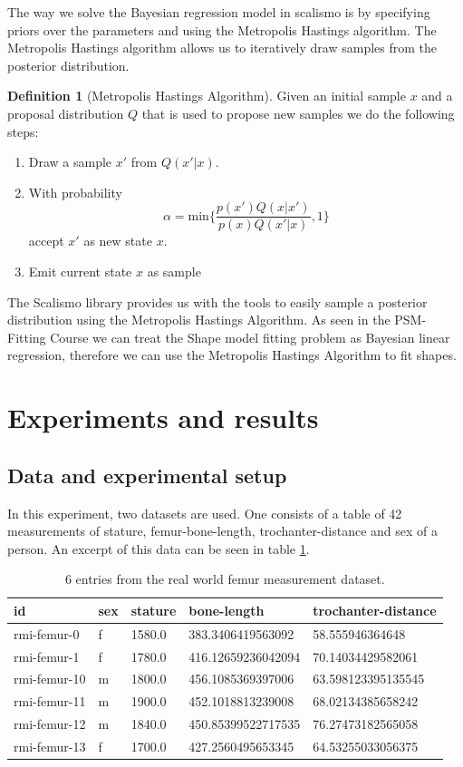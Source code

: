 \documentclass[10pt]{article}
\theoremstyle{definition}
\newtheorem{definition}{Definition}[section]
\begin{document}
\noindent
The way we solve the Bayesian regression model in scalismo is by specifying priors over the parameters and using the Metropolis Hastings algorithm. The Metropolis Hastings algorithm allows us to iteratively draw samples from the posterior distribution.

\begin{definition}[Metropolis Hastings Algorithm]\label{def:metro}
Given an initial sample $x$ and a proposal distribution $Q$ that is used to propose new samples we do the following steps:
\begin{enumerate}
\item Draw a sample $x'$ from $Q(x'|x)$.
\item With probability $$\alpha=\text{min}\{\frac{p(x')Q(x|x')}{p(x)Q(x'|x)},1\}$$
accept $x'$ as new state $x$.
\item Emit current state $x$ as sample
\end{enumerate}
\end{definition}

\noindent
The Scalismo library provides us with the tools to easily sample a posterior distribution using the Metropolis Hastings Algorithm. As seen in the PSM-Fitting Course we can treat the Shape model fitting problem as Bayesian linear regression, therefore we can use the Metropolis Hastings Algorithm to fit shapes.



\section{Experiments and results}

\subsection{Data and experimental setup}
In this experiment, two datasets are used. One consists of a table of 42 measurements of stature, femur-bone-length, trochanter-distance and sex of a person. An excerpt of this data can be seen in table \ref{table:1}.

\begin{table}[h]
    \centering
    \begin{tabular}{l|l|l|l|l}
        id & sex & stature & bone-length & trochanter-distance \\ \hline
        rmi-femur-0 & f & 1580.0 & 383.3406419563092 & 58.555946364648 \\ \hline
        rmi-femur-1 & f & 1780.0 & 416.12659236042094 & 70.14034429582061 \\ \hline
        rmi-femur-10 & m & 1800.0 & 456.1085369397006 & 63.598123395135545 \\ \hline
        rmi-femur-11 & m & 1900.0 & 452.1018813239008 & 68.02134385658242 \\ \hline
        rmi-femur-12 & m & 1840.0 & 450.85399522717535 & 76.27473182565058 \\ \hline
        rmi-femur-13 & f & 1700.0 & 427.2560495653345 & 64.53255033056375 \\
    \end{tabular}
    \caption{6 entries from the real world femur measurement dataset.}
    \label{table:1}
\end{table}
\end{document}
